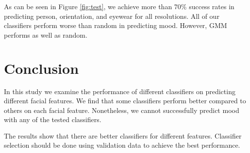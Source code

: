 \documentclass{article} %
\begin{document}
As can be seen in Figure \ref{fig:test}, we achieve more than 70\% success rates in predicting person, orientation, and eyewear for all resolutions.  All of our classifiers perform worse than random in predicting mood. However, GMM performs as well as random.

\section{Conclusion}

In this study we examine the performance of different classifiers on predicting different facial features. We find that some classifiers perform better compared to others on each facial feature.  Nonetheless, we cannot successfully predict mood with any of the tested classifiers.  

The results show that there are better classifiers for different features.  Classifier selection should be done using validation data to achieve the best performance.  

{}

\end{document}
